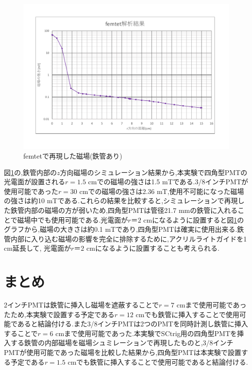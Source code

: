 \begin{figure}[H]
	\centering
		\includegraphics[width=15cm]{fig/iguchi/femtetsaigengraph.pdf}
	\caption{femtetで再現した磁場(鉄管あり)}
	\label{femtetsaigengraph}
\end{figure}
図\ref{femtetsaigengraph}の,鉄管内部の$z$方向磁場のシミュレーション結果から,本実験で四角型PMTの光電面が設置される$r=1.5$ cmでの磁場の強さは1.5 mTである.3/8インチPMTが使用可能であった$r=30$ cmでの磁場の強さは2.36 mT,使用不可能になった磁場の強さは約10 mTである.これらの結果を比較すると,シミュレーションで再現した鉄管内部の磁場の方が弱いため,四角型PMTは管径21.7 mmの鉄管に入れることで磁場中でも使用可能である.光電面が$r＝2$ cmになるように設置すると図\ref{femtetsaigengraph}のグラフから,磁場の大きさは約0.1 mTであり,四角型PMTは確実に使用出来る.鉄管内部に入り込む磁場の影響を完全に排除するために,アクリルライトガイドを1 cm延長して,
光電面が$r＝2$ cmになるように設置することも考えられる.

\section{まとめ}
2インチPMTは鉄管に挿入し磁場を遮蔽することで$r=7$ cmまで使用可能であったため,本実験で設置する予定である$r=12$ cmでも鉄管に挿入することで使用可能であると結論付ける.また3/8インチPMTは2つのPMTを同時計測し鉄管に挿入することで$r=6$ cmまで使用可能であった.本実験でSCtrig用の四角型PMTを挿入する鉄管の内部磁場を磁場シュミレーションで再現したものと,3/8インチPMTが使用可能であった磁場を比較した結果から,四角型PMTは本実験で設置する予定である$r=1.5$ cmでも鉄管に挿入することで使用可能であると結論付ける.



